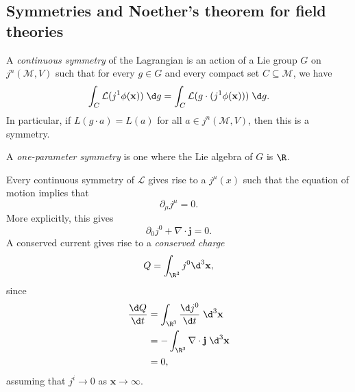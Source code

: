 \documentclass[a4paper]{article}
\begin{document}
\subsection{Symmetries and Noether's theorem for field theories}
\begin{own}
  \begin{defi}
    A \emph{continuous symmetry} of the Lagrangian is an action of a Lie group $G$ on $j^n(\mathcal{M}, V)$ such that for every $g \in G$ and every compact set $C \subseteq \mathcal{M}$, we have
    \[
      \int_C \mathcal{L}(j^1\phi(\mathbf{x})) \;\d g = \int_C \mathcal{L}(g \cdot (j^1\phi(\mathbf{x})))\;\d g.
    \]
    In particular, if $L(g \cdot a) = L(a)$ for all $a \in j^n(\mathcal{M}, V)$, then this is a symmetry.

    A \emph{one-parameter symmetry} is one where the Lie algebra of $G$ is $\R$.
  \end{defi}
\end{own}
\begin{thm}
  Every continuous symmetry of $\mathcal{L}$ gives rise to a  $j^\mu(x)$ such that the equation of motion implies that
  \[
    \partial_\mu j^\mu = 0.
  \]
  More explicitly, this gives
  \[
    \partial_0 j^0 + \nabla \cdot \mathbf{j} = 0.
  \]
  A conserved current gives rise to a \emph{conserved charge}
  \[
    Q = \int_{\R^3} j^0 \d^3 \mathbf{x},
  \]
  since
  \begin{align*}
    \frac{\d Q}{\d t} &= \int_{\R^3} \frac{\d j^0}{\d t} \;\d^3 \mathbf{x}\\
    &= -\int_{\R^3} \nabla \cdot \mathbf{j} \;\d ^3 \mathbf{x}\\
    &= 0,
  \end{align*}
  assuming that $j^i \to 0$ as $\mathbf{x} \to \infty$.
\end{thm}
\end{document}
